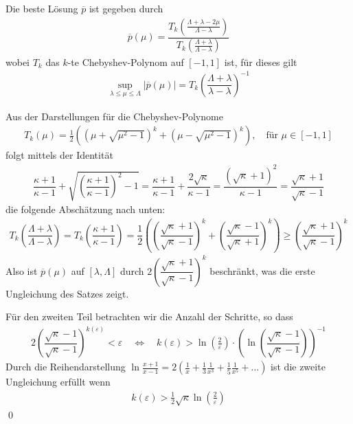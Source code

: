 Die beste Lösung $\overline{p}$ ist gegeben durch 
%
\begin{align*}
  \overline{p}(\mu) 
  = \dfrac{T_k(\tfrac{\Lambda+\lambda-2\mu}{\Lambda-\lambda})}
  {T_k(\tfrac{\Lambda+\lambda}{\Lambda-\lambda})}
\end{align*}
%
wobei $T_k$ das $k$-te Chebyshev-Polynom auf $[-1,1]$ ist, für dieses gilt
%
\begin{align*}
  \sup_{\lambda\leq\mu\leq\Lambda} |\overline{p}(\mu)| 
  = T_k\left(\dfrac{\Lambda+\lambda}{\lambda-\lambda}\right)^{-1}
\end{align*}

Aus der Darstellungen für die Chebyshev-Polynome
%
\begin{align*}
  T_k(\mu) 
  = \tfrac{1}{2}\left((\mu+\sqrt{\mu^2-1})^k+(\mu-\sqrt{\mu^2-1})^k\right), 
  \quad \text{für } \mu\in[-1,1]
\end{align*}
%
folgt mittels der Identität
%
\begin{align*}
  \dfrac{\kappa+1}{\kappa-1} + \sqrt{\left(\dfrac{\kappa+1}{\kappa-1}\right)^2-1} 
  = \dfrac{\kappa+1}{\kappa-1} + \dfrac{2\sqrt{\kappa}}{\kappa-1} = \dfrac{(\sqrt{\kappa}+1)^2}{\kappa - 1}
  = \dfrac{\sqrt{\kappa}+1}{\sqrt{\kappa}-1}
\end{align*}
%
die folgende Abschätzung nach unten:
%
\begin{align*}T_k\left(\dfrac{\Lambda+\lambda}{\Lambda-\lambda}\right) = T_k\left(\dfrac{\kappa+1}{\kappa-1}\right)
= \dfrac{1}{2}\left(\left(\dfrac{\sqrt{\kappa}+1}{\sqrt{\kappa}-1}\right)^k + 
\left(\dfrac{\sqrt{\kappa}-1}{\sqrt{\kappa}+1}\right)^k\right) 
\geq \left(\dfrac{\sqrt{\kappa}+1}{\sqrt{\kappa}-1}\right)^k
\end{align*}
%
Also ist $\overline{p}(\mu)$ auf $[\lambda,\Lambda]$ durch $2\left(\dfrac{\sqrt{\kappa}+1}{\sqrt{\kappa}-1}\right)^k$ beschränkt, 
was die erste Ungleichung des Satzes zeigt. 

Für den zweiten Teil betrachten wir die Anzahl der Schritte, so dass
%
\begin{align*}
  2\left(\dfrac{\sqrt{\kappa}-1}{\sqrt{\kappa}-1}\right)^{k(\varepsilon)} 
  < \varepsilon 
  \quad \iff \quad 
  k(\varepsilon) 
  > \ln(\tfrac{2}{\varepsilon})\cdot\left(\ln\left(\dfrac{\sqrt{\kappa}-1}{\sqrt{\kappa}-1}\right)\right)^{-1}
\end{align*}
%
Durch die Reihendarstellung $\ln\tfrac{x+1}{x-1} = 2(\tfrac{1}{x} + \tfrac{1}{3}\tfrac{1}{x^3} 
+ \tfrac{1}{5}\tfrac{1}{x^5} + \dots)$ ist die zweite Ungleichung erfüllt wenn 
%
\begin{align*}
  k(\varepsilon) > \tfrac{1}{2}\sqrt{\kappa}\ln(\tfrac{2}{\varepsilon})
\end{align*}
%
\qed